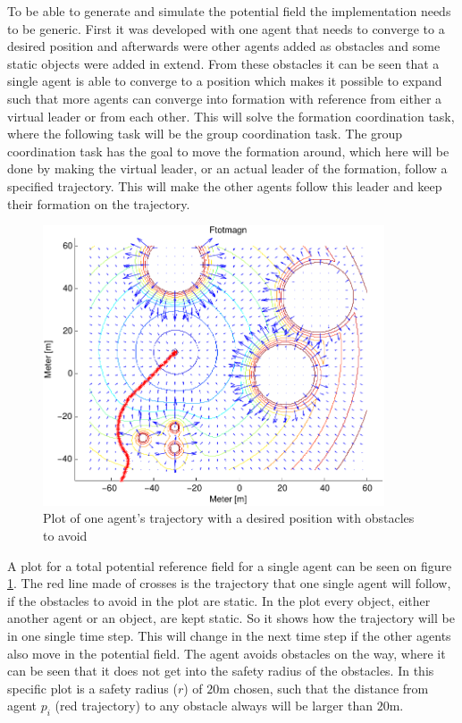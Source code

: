 To be able to generate and simulate the potential field the
implementation needs to be generic. First it was developed with one
agent that needs to converge to a desired position and afterwards were
other agents added as obstacles and some static objects were added in
extend. From these obstacles it can be seen that a single agent is
able to converge to a position which makes it possible to expand such
that more agents can converge into formation with reference from
either a virtual leader or from each other. This will solve the
formation coordination task, where the following task will be the
group coordination task. The group coordination task has the goal to
move the formation around, which here will be done by making the
virtual leader, or an actual leader of the formation, follow a
specified trajectory. This will make the other agents follow this
leader and keep their formation on the trajectory.

\begin{figure}[htbp]
  \includegraphics[width=0.9\textwidth]{fig/ftotmagnfigpdf1}
  \caption{Plot of one agent's trajectory with a desired position with obstacles to avoid}
  \label{fig:potfieldagenti}
\end{figure}

A plot for a total potential reference field for a single agent can be
seen on figure \ref{fig:potfieldagenti}. The red line made of crosses
is the trajectory that one single agent will follow, if the obstacles
to avoid in the plot are static. In the plot every object, either
another agent or an object, are kept static. So it shows how the
trajectory will be in one single time step. This will change in the
next time step if the other agents also move in the potential field.
The agent avoids obstacles on the way, where it can be seen that it
does not get into the safety radius of the obstacles. In this specific
plot is a safety radius ($r$) of $20$m chosen, such that the distance
from agent $p_i$ (red trajectory) to any obstacle always will be
larger than $20$m.

